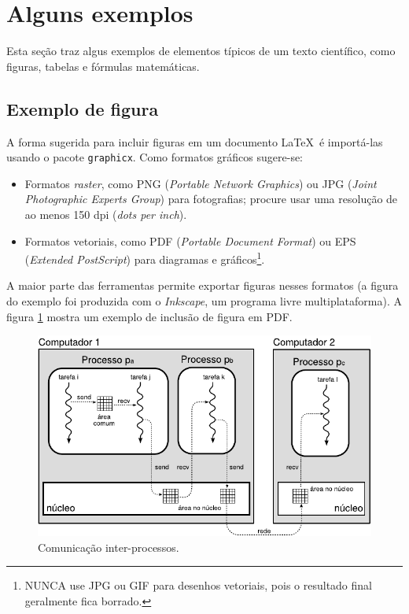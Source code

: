 
\section{Alguns exemplos}

Esta seção traz algus exemplos de elementos típicos de um texto científico, como figuras, tabelas e fórmulas matemáticas.


\subsection{Exemplo de figura}

A forma sugerida para incluir figuras em um documento \LaTeX\ é importá-las usando o pacote \texttt{graphicx}. Como formatos gráficos sugere-se:

\begin{itemize}

\item Formatos \emph{raster}, como PNG (\emph{Portable Network Graphics}) ou JPG (\emph{Joint Photographic Experts Group}) para fotografias; procure usar uma resolução de ao menos 150 dpi (\emph{dots per inch}).

\item Formatos vetoriais, como PDF (\emph{Portable Document Format}) ou EPS (\emph{Extended PostScript}) para diagramas e gráficos\footnote{NUNCA use JPG ou GIF para desenhos vetoriais, pois o resultado final geralmente fica borrado.}.

\end{itemize}

A maior parte das ferramentas permite exportar figuras nesses formatos (a figura do exemplo foi produzida com o \emph{Inkscape}, um programa livre multiplataforma). A figura \ref{fig:comun-intra-inter} mostra um exemplo de inclusão de figura em PDF.

\begin{figure}[!htb]
\centering
\includegraphics[width=12cm]{exemplo-figura.pdf}
\caption{Comunicação inter-processos.}
\label{fig:comun-intra-inter}
\end{figure}

